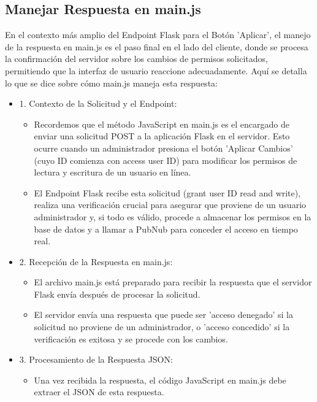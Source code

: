 \documentclass{report}
\begin{document}
\subsection{Manejar Respuesta en \textbf{main.js}}
En el contexto más amplio del Endpoint Flask para el Botón 'Aplicar', el manejo de la respuesta en main.js es el paso final 
en el lado del cliente, donde se procesa la confirmación del servidor sobre los cambios de permisos solicitados, permitiendo 
que la interfaz de usuario reaccione adecuadamente.
Aquí se detalla lo que se dice sobre cómo main.js maneja esta respuesta:
\begin{itemize}
    \item 1. Contexto de la Solicitud y el Endpoint:
        \begin{itemize}
            \item Recordemos que el método JavaScript en main.js es el encargado de enviar una solicitud POST a la aplicación 
            Flask en el servidor. Esto ocurre cuando un administrador presiona el botón 'Aplicar Cambios' (cuyo ID comienza con 
            access user ID) para modificar los permisos de lectura y escritura de un usuario en línea.
            \item El Endpoint Flask recibe esta solicitud (grant user ID read and write), realiza una verificación crucial para asegurar 
            que proviene de un usuario administrador y, si todo es válido, procede a almacenar los permisos en la base de datos y a llamar 
            a PubNub para conceder el acceso en tiempo real.
        \end{itemize}
    \item 2. Recepción de la Respuesta en main.js:
        \begin{itemize}
            \item El archivo main.js está preparado para recibir la respuesta que el servidor Flask envía después de procesar la solicitud.
            \item El servidor envía una respuesta que puede ser 'acceso denegado' si la solicitud no proviene de un administrador, o 
            'acceso concedido' si la verificación es exitosa y se procede con los cambios.
        \end{itemize}
    \item 3. Procesamiento de la Respuesta JSON:
        \begin{itemize}
            \item Una vez recibida la respuesta, el código JavaScript en main.js debe extraer el JSON de esta respuesta.

\end{itemize}
\end{itemize}
\end{document}
